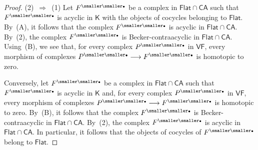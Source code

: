 \documentclass[10pt,a4paper]{amsart}
\newcommand{\CA}{\mathsf{CA}}
\newcommand{\Flat}{\mathsf{Flat}}
\newcommand{\VF}{\mathsf{VF}}
\newcommand{\bu}{{\text{\smaller\smaller$\scriptstyle\bullet$}}}
\newcommand{\rarrow}{\longrightarrow}
\newcommand{\sK}{\mathsf K}
\begin{document}
\begin{proof}
 (2)~$\Longrightarrow$~(1) Let $F^\bu$ be a complex in $\Flat\cap\CA$
such that $F^\bu$ is acyclic in $\sK$ with the objects of cocycles
belonging to $\Flat$.
 By~(A), it follows that the complex $F^\bu$ is acyclic in
$\Flat\cap\CA$.
 By~(2), the complex $F^\bu$ is Becker-contraacyclic in $\Flat\cap\CA$.
 Using~(B), we see that, for every complex $P^\bu$ in $\VF$, every
morphism of complexes $P^\bu\rarrow F^\bu$ is homotopic to zero.

 Conversely, let $F^\bu$ be a complex in $\Flat\cap\CA$ such that
$F^\bu$ is acyclic in $\sK$ and, for every complex $P^\bu$ in $\VF$,
every morphism of complexes $P^\bu\rarrow F^\bu$ is homotopic to zero.
 By~(B), it follows that the complex $F^\bu$ is Becker-contraacyclic
in $\Flat\cap\CA$.
 By~(2), the complex $F^\bu$ is acyclic in $\Flat\cap\CA$.
 In particular, it follows that the objects of cocycles of $F^\bu$
belong to $\Flat$.
\end{proof}
\end{document}
